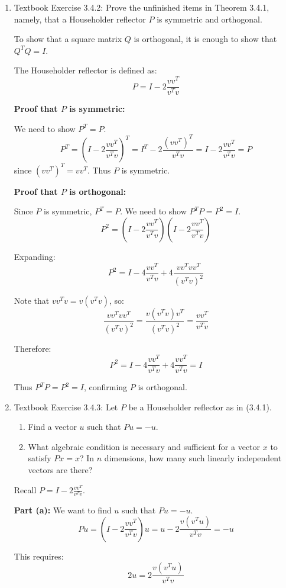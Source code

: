 \documentclass[reqno, answers]{exam}
\begin{document}
\begin{enumerate}
\item Textbook Exercise 3.4.2: Prove the unfinished items in Theorem 3.4.1, namely, that a Householder reflector $P$ is symmetric and orthogonal.

To show that a square matrix $Q$ is orthogonal, it is enough to show that $Q^T Q = I$.

\begin{solution}
The Householder reflector is defined as:
\[
P = I - 2\frac{vv^T}{v^T v}
\]

\textbf{Proof that $P$ is symmetric:}

We need to show $P^T = P$.
\[
P^T = \left(I - 2\frac{vv^T}{v^T v}\right)^T = I^T - 2\frac{(vv^T)^T}{v^T v} = I - 2\frac{vv^T}{v^T v} = P
\]
since $(vv^T)^T = vv^T$. Thus $P$ is symmetric.

\textbf{Proof that $P$ is orthogonal:}

Since $P$ is symmetric, $P^T = P$. We need to show $P^T P = P^2 = I$.
\[
P^2 = \left(I - 2\frac{vv^T}{v^T v}\right)\left(I - 2\frac{vv^T}{v^T v}\right)
\]

Expanding:
\[
P^2 = I - 4\frac{vv^T}{v^T v} + 4\frac{vv^T vv^T}{(v^T v)^2}
\]

Note that $vv^T v = v(v^T v)$, so:
\[
\frac{vv^T vv^T}{(v^T v)^2} = \frac{v(v^T v)v^T}{(v^T v)^2} = \frac{vv^T}{v^T v}
\]

Therefore:
\[
P^2 = I - 4\frac{vv^T}{v^T v} + 4\frac{vv^T}{v^T v} = I
\]

Thus $P^T P = P^2 = I$, confirming $P$ is orthogonal.
\end{solution}

\item Textbook Exercise 3.4.3: Let $P$ be a Householder reflector as in (3.4.1).
\begin{enumerate}
\item[(a)] Find a vector $u$ such that $Pu = -u$.
\item[(b)] What algebraic condition is necessary and sufficient for a vector $x$ to satisfy $Px = x$? In $n$ dimensions, how many such linearly independent vectors are there?
\end{enumerate}

\begin{solution}
Recall $P = I - 2\frac{vv^T}{v^T v}$.

\textbf{Part (a):} We want to find $u$ such that $Pu = -u$.
\[
Pu = \left(I - 2\frac{vv^T}{v^T v}\right)u = u - 2\frac{v(v^T u)}{v^T v} = -u
\]

This requires:
\[
2u = 2\frac{v(v^T u)}{v^T v}
\]


\end{solution}
\end{enumerate}
\end{document}
